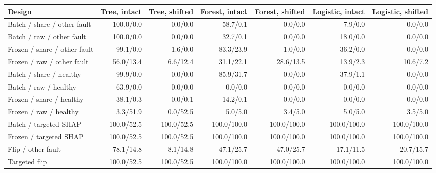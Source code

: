 \begin{tabular}{lrrrrrr}
\toprule
Design & Tree, intact & Tree, shifted & Forest, intact & Forest, shifted & Logistic, intact & Logistic, shifted \\
\midrule
Batch / share / other fault & 100.0/0.0 & 0.0/0.0 & 58.7/0.1 & 0.0/0.0 & 7.9/0.0 & 0.0/0.0 \\
Batch / raw / other fault & 100.0/0.0 & 0.0/0.0 & 32.7/0.1 & 0.0/0.0 & 18.0/0.0 & 0.0/0.0 \\
Frozen / share / other fault & 99.1/0.0 & 1.6/0.0 & 83.3/23.9 & 1.0/0.0 & 36.2/0.0 & 0.0/0.0 \\
Frozen / raw / other fault & 56.0/13.4 & 6.6/12.4 & 31.1/22.1 & 28.6/13.5 & 13.9/2.3 & 10.6/7.2 \\
Batch / share / healthy & 99.9/0.0 & 0.0/0.0 & 85.9/31.7 & 0.0/0.0 & 37.9/1.1 & 0.0/0.0 \\
Batch / raw / healthy & 63.9/0.0 & 0.0/0.0 & 0.0/0.0 & 0.0/0.0 & 0.0/0.0 & 0.0/0.0 \\
Frozen / share / healthy & 38.1/0.3 & 0.0/0.1 & 14.2/0.1 & 0.0/0.0 & 0.0/0.0 & 0.0/0.0 \\
Frozen / raw / healthy & 3.3/51.9 & 0.0/52.5 & 5.0/5.0 & 3.4/5.0 & 5.0/5.0 & 3.5/5.0 \\
Batch / targeted SHAP & 100.0/52.5 & 100.0/52.5 & 100.0/100.0 & 100.0/100.0 & 100.0/100.0 & 100.0/100.0 \\
Frozen / targeted SHAP & 100.0/52.5 & 100.0/52.5 & 100.0/100.0 & 100.0/100.0 & 100.0/100.0 & 100.0/100.0 \\
Flip / other fault & 78.1/14.8 & 8.1/14.8 & 47.1/25.7 & 47.0/25.7 & 17.1/11.5 & 20.7/15.7 \\
Targeted flip & 100.0/52.5 & 100.0/52.5 & 100.0/100.0 & 100.0/100.0 & 100.0/100.0 & 100.0/100.0 \\
\bottomrule
\end{tabular}
